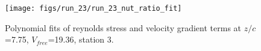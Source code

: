 \begin{figure}[H]
\centering
\texttt{[image: figs/run\_23/run\_23\_nut\_ratio\_fit]}
\caption{Polynomial fits of reynolds stress and velocity gradient terms at $z/c$=7.75, $V_{free}$=19.36, station 3.}
\label{fig:run_23_nut_ratio_fit}
\end{figure}


